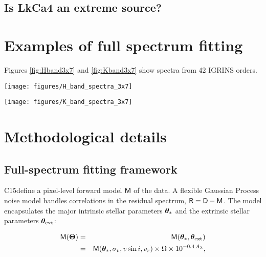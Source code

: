 \documentclass[twocolumn]{emulateapj}%
\newcommand{\iancze}{{\sc C15}}
\newcommand{\name}{LkCa4 }
\begin{document}
\subsection{Is \name an extreme source?}



\clearpage
\pagebreak


\appendix

\section{Examples of full spectrum fitting}

Figures \ref{fig:Hband3x7} and \ref{fig:Kband3x7} show spectra from 42 IGRINS orders.


\begin{figure*}
	\centering
	\texttt{[image: figures/H\_band\_spectra\_3x7]}
	\caption{IGRINS Orders 94 and $99-119$.  Note that the $y-$axis is on a logarithmic scale.  }
	\label{fig:Hband3x7}
\end{figure*}

\begin{figure*}
	\centering
	\texttt{[image: figures/K\_band\_spectra\_3x7]}
	\caption{IGRINS Orders $73-93$.  Note that the $y-$axis is on a logarithmic scale.  }
	\label{fig:Kband3x7}
\end{figure*}


\section{Methodological details}
\label{methods-details}

\subsection{Full-spectrum fitting framework}

\iancze define a pixel-level forward model $\mathsf{M}$ of the data.  A flexible Gaussian Process noise model handles correlations in the residual spectrum, $\mathsf{R}= \mathsf{D} - \mathsf{M}$.  The model encapsulates the major intrinsic stellar parameters ${\bm \theta}_{\ast}$ and the extrinsic stellar parameters ${\bm \theta}_{\rm ext}$:

\begin{eqnarray} \label{eqn:scaling}
\mathsf{M}({\bm \Theta}) &=& \mathsf{M}({\bm \theta}_{\ast}, {\bm \theta}_{\rm ext}) \\
         &=& \mathsf{M}({\bm \theta}_{\ast}, \sigma_v, v\sin{i}, v_r) \times \Omega \times 10^{-0.4\,A_{\lambda}}, \nonumber
\end{eqnarray}
\end{document}
